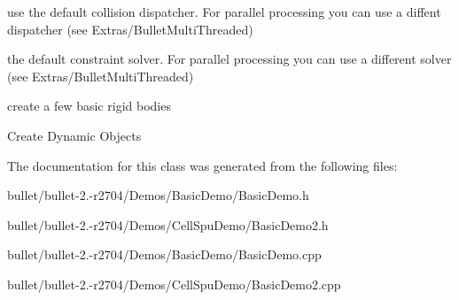 use the default collision dispatcher. For parallel processing you can use a diffent dispatcher (see Extras/\+Bullet\+Multi\+Threaded)

the default constraint solver. For parallel processing you can use a different solver (see Extras/\+Bullet\+Multi\+Threaded)

create a few basic rigid bodies

Create Dynamic Objects 

The documentation for this class was generated from the following files\+:\begin{DoxyCompactItemize}
\item 
bullet/bullet-\/2.-\/r2704/\+Demos/\+Basic\+Demo/Basic\+Demo.\+h\item 
bullet/bullet-\/2.-\/r2704/\+Demos/\+Cell\+Spu\+Demo/Basic\+Demo2.\+h\item 
bullet/bullet-\/2.-\/r2704/\+Demos/\+Basic\+Demo/Basic\+Demo.\+cpp\item 
bullet/bullet-\/2.-\/r2704/\+Demos/\+Cell\+Spu\+Demo/Basic\+Demo2.\+cpp\end{DoxyCompactItemize}
